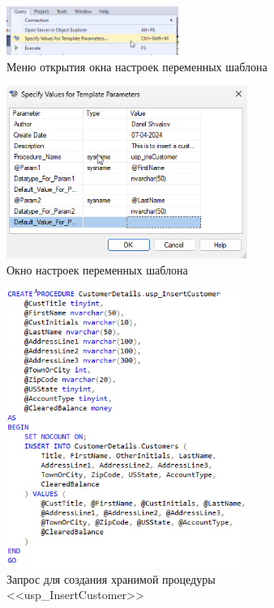 \documentclass[a4paper, 14pt]{extarticle}
\begin{document}
\begin{figure}[H]
  \centering
  \includegraphics[width=0.5\textwidth]{images/task-1/3.png}
  \caption{Меню открытия окна настроек переменных шаблона}
  \label{fig:task-1-3}
\end{figure}

\begin{figure}[H]
  \centering
  \includegraphics[width=0.7\textwidth]{images/task-1/4.png}
  \caption{Окно настроек переменных шаблона}
  \label{fig:task-1-4}
\end{figure}

\begin{figure}[H]
  \centering
  \includegraphics[width=0.7\textwidth]{images/task-1/5.png}
  \caption{
    Запрос для создания хранимой процедуры <<usp\_InsertCustomer>>
  }
  \label{fig:task-1-5}
\end{figure}
\end{document}
